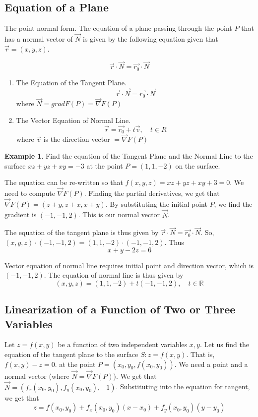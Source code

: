 \documentclass[11pt]{article}
\theoremstyle{plain} %
\theoremstyle{definition}
\theoremstyle{example}
\newtheorem*{example}{Example}
\theoremstyle{remark}
\begin{document}
\subsection{Equation of a Plane}
The point-normal form. The equation of a plane passing through the point $P$ that has a normal vector of $\vec{N}$ is given by the following equation given that $\vec{r} = (x, y, z)$.

$$\vec{r} \cdot \vec{N} = \vec{r_0} \cdot \vec{N}$$
\begin{enumerate}
	\item The Equation of the Tangent Plane. 
	$$\vec{r} \cdot \vec{N} = \vec{r_0} \cdot \vec{N}$$
	where $\vec{N} = grad F(P) = \vec{\nabla}F(P)$
	\item The Vector Equation of Normal Line. 
	$$ \vec{r} = \vec{r_0} + t\vec{v}, \quad t \in R$$
	where $\vec{v}$ is the direction vector $= \vec{\nabla}F(P)$
\end{enumerate}


\begin{example}
Find the equation of the Tangent Plane and the Normal Line to the surface $xz+yz+xy=-3$ at the point $P=(1, 1, -2)$ on the surface. 
\end{example}The equation can be re-written so that $f(x, y, z) = xz+yz+xy+3=0$. We need to compute $\vec{\nabla}F(P)$. Finding the partial derivatives, we get that $\vec{\nabla}F(P) = (z+y, z+x, x+y)$. By substituting the initial point $P$, we find the gradient is $(-1, -1, 2)$. This is our normal vector $\vec{N}$. 

The equation of the tangent plane is thus given by $\vec{r} \cdot \vec{N} = \vec{r_0} \cdot \vec{N}$. So, $(x, y, z) \cdot (-1,-1,2) = (1,1,-2) \cdot (-1,-1,2)$. Thus $$x+y-2z=6$$ 

Vector equation of normal line requires initial point and direction vector, which is $(-1,-1,2)$. The equation of normal line is thus given by
$$(x, y, z) = (1, 1, -2) + t(-1,-1,2), \quad t \in \mathbb R$$

\subsection{Linearization of a Function of Two or Three Variables}

Let $ z = f(x,y)$ be a function of two independent variables $x, y$. Let us find the equation of the tangent plane to the surface $S:z =f(x,y)$. That is, $f(x,y)-z=0$. at the point $P=(x_0, y_0, f(x_0, y_0))$. We need a point and a normal vector (where $\vec{N} = \vec{\nabla}F(P)$). We get that $\vec{N} = \left(f_x(x_0,y_0), f_y(x_0,y_0), -1\right)$. Substituting into the equation for tangent, we get that $$z = f(x_0, y_0) + f_x(x_0, y_0)(x-x_0) + f_y(x_0, y_0)(y-y_0)$$
\end{document}
